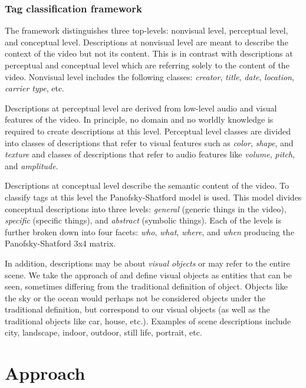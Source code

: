 \subsubsection{Tag classification framework}\label{tag_class_framework}

The framework distinguishes three top-levels: nonvisual level, perceptual
level, and conceptual level. Descriptions at nonvisual level are meant to
describe the context of the video but not its content. This is in contrast
with descriptions at perceptual and conceptual level which are referring
solely to the content of the video. Nonvisual level includes the following
classes: \textit{creator}, \textit{title}, \textit{date}, \textit{location},
\textit{carrier type}, etc.

Descriptions at perceptual level are derived from low-level audio and visual
features of the video. In principle, no domain and no worldly knowledge is
required to create descriptions at this level. Perceptual level classes are
divided into classes of descriptions that refer to visual features such as
\textit{color}, \textit{shape}, and \textit{texture} and classes of
descriptions that refer to audio features like \textit{volume},
\textit{pitch}, and \textit{amplitude}.

Descriptions at conceptual level describe the semantic content of the video.
To classify tags at this level the Panofsky-Shatford model is used. This model
divides conceptual descriptions into three levels: \textit{general} (generic
things in the video), \textit{specific} (specific things), and
\textit{abstract} (symbolic things). Each of the levels is further broken down
into four facets: \textit{who}, \textit{what}, \textit{where}, and
\textit{when} producing the Panofsky-Shatford 3x4 matrix. 

In addition, descriptions may be about \textit{visual objects} or may refer to
the entire scene. We take the approach of \cite{Jaimes00aconceptual} and
define visual objects as entities that can be seen, sometimes differing from
the traditional definition of object. Objects like the sky or the ocean would
perhaps not be considered objects under the traditional definition, but
correspond to our visual objects (as well as the traditional objects like car,
house, etc.). Examples of scene descriptions include city, landscape, indoor,
outdoor, still life, portrait, etc.


\section{Approach}\label{sec:approach}

